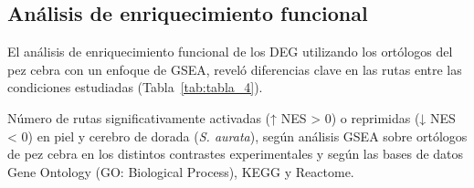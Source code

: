 \documentclass[10pt,a4paper]{article}
\begin{document}
\subsection{Análisis de enriquecimiento funcional}
El análisis de enriquecimiento funcional de los DEG utilizando los ortólogos del pez cebra con un enfoque de GSEA, reveló diferencias clave en las rutas entre las condiciones estudiadas (Tabla~\ref{tab:tabla_4}). 

\begin{table}[ht]
  \centering
  \caption{Número de rutas significativamente activadas (↑ NES > 0) o reprimidas (↓ NES < 0) en piel y cerebro de dorada (\textit{S. aurata}), según análisis GSEA sobre ortólogos de pez cebra en los distintos contrastes experimentales y según las bases de datos Gene Ontology (GO: Biological Process), KEGG y Reactome.}
  \label{tab:tabla_4}

  {\fontsize{8}{11}\selectfont
  \setlength{\tabcolsep}{1pt}
  \renewcommand{\arraystretch}{1.05}

  \newcommand{\up}{\raisebox{0.45ex}{\scriptsize$\uparrow$}}
  \newcommand{\down}{\raisebox{-0.3ex}{\scriptsize$\downarrow$}}

}
\end{table}
\end{document}

